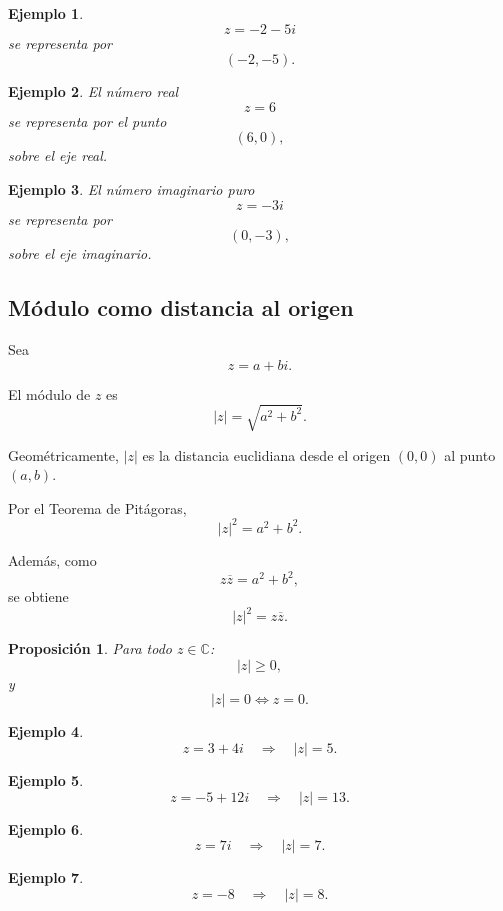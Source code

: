 \documentclass[12pt]{article}
\newtheorem{Ejem}{Ejemplo}
\newtheorem{Prop}{Proposici\'on}
\begin{document}
\begin{Ejem} 
\[
z=-2-5i
\]
se representa por
\[
(-2,-5).
\]

\end{Ejem}

\begin{Ejem} El número real
\[
z=6
\]
se representa por el punto
\[
(6,0),
\]
sobre el eje real.

\end{Ejem}

\begin{Ejem} El número imaginario puro
\[
z=-3i
\]
se representa por
\[
(0,-3),
\]
sobre el eje imaginario.
\end{Ejem}


\subsection*{Módulo como distancia al origen}

Sea
\[
z=a+bi.
\]

El módulo de $z$ es
\[
\boxed{|z|=\sqrt{a^2+b^2}.}
\]

Geométricamente, $|z|$ es la distancia euclidiana desde el origen $(0,0)$ al
punto $(a,b)$.

Por el Teorema de Pitágoras,
\[
|z|^2=a^2+b^2.
\]

Además, como
\[
z\overline z=a^2+b^2,
\]
se obtiene
\[
\boxed{|z|^2=z\overline z.}
\]

\begin{Prop}
Para todo $z\in\mathbb{C}$:
\[
|z|\geq 0,
\]
y
\[
\boxed{|z|=0\iff z=0.}
\]
\end{Prop}

\begin{Ejem} \[
z=3+4i
\quad\Longrightarrow\quad
|z|=5.
\]

\end{Ejem}

\begin{Ejem} \[
z=-5+12i
\quad\Longrightarrow\quad
|z|=13.
\]

\end{Ejem}

\begin{Ejem} \[
z=7i
\quad\Longrightarrow\quad
|z|=7.
\]

\end{Ejem}

\begin{Ejem} \[
z=-8
\quad\Longrightarrow\quad
|z|=8.
\]

\end{Ejem}
\end{document}
